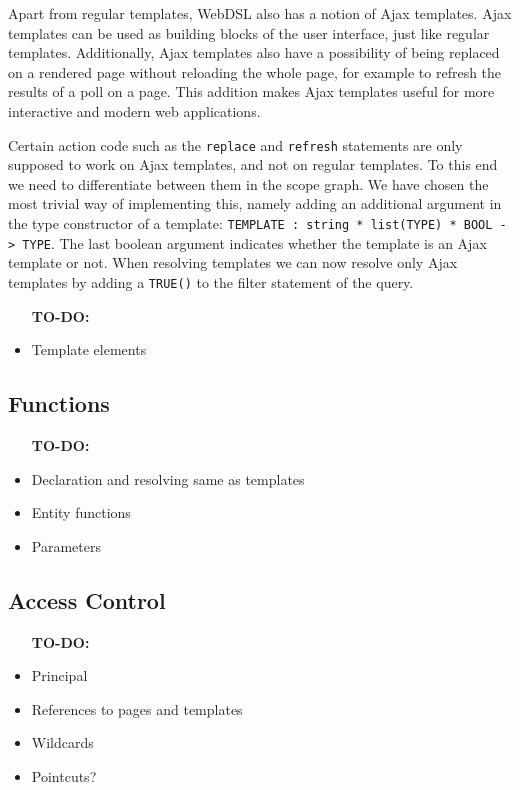       Apart from regular templates, WebDSL also has a notion of Ajax templates. Ajax templates can be used as building blocks of the user interface, just like regular templates. Additionally, Ajax templates also have a possibility of being replaced on a rendered page without reloading the whole page, for example to refresh the results of a poll on a page. This addition makes Ajax templates useful for more interactive and modern web applications.

      Certain action code such as the \texttt{replace} and \texttt{refresh} statements are only supposed to work on Ajax templates, and not on regular templates. To this end we need to differentiate between them in the scope graph. We have chosen the most trivial way of implementing this, namely adding an additional argument in the type constructor of a template: \texttt{TEMPLATE : string * list(TYPE) * BOOL -> TYPE}. The last boolean argument indicates whether the template is an Ajax template or not. When resolving templates we can now resolve only Ajax templates by adding a \texttt{TRUE()} to the filter statement of the query.

      \begin{itemize}
        \item [\textbf{TO-DO:}]
        \item Template elements
      \end{itemize}

    \subsection{\label{subsec:simple-functions}Functions}

      \begin{itemize}
        \item [\textbf{TO-DO:}]
        \item Declaration and resolving same as templates
        \item Entity functions
        \item Parameters
      \end{itemize}

    \subsection{\label{subsec:access-control}Access Control}

      \begin{itemize}
        \item [\textbf{TO-DO:}]
        \item Principal
        \item References to pages and templates
        \item Wildcards
        \item Pointcuts?
      \end{itemize}

